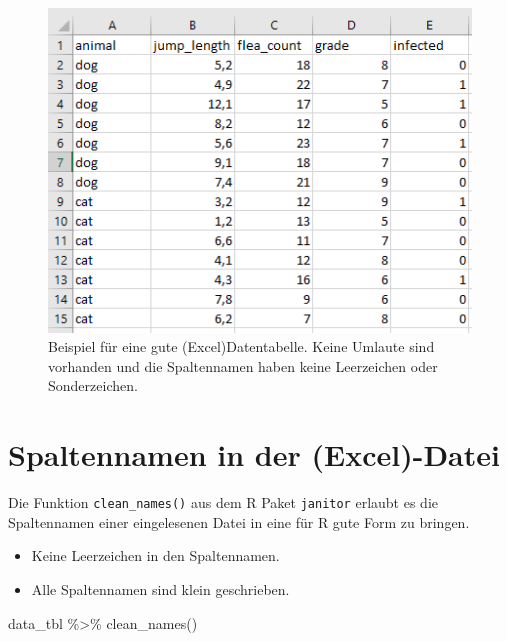 \documentclass[
  letterpaper,
]{scrbook}
\newenvironment{Shaded}{\begin{snugshade}}{\end{snugshade}}
\newcommand{\FunctionTok}[1]{\textcolor[rgb]{0.28,0.35,0.67}{#1}}
\newcommand{\NormalTok}[1]{\textcolor[rgb]{0.00,0.23,0.31}{#1}}
\newcommand{\SpecialCharTok}[1]{\textcolor[rgb]{0.37,0.37,0.37}{#1}}
\providecommand{\tightlist}{%
  \setlength{\itemsep}{0pt}\setlength{\parskip}{0pt}}\usepackage{longtable,booktabs,array}
\begin{document}
\begin{figure}

{\centering \includegraphics{./images/import_03.PNG}

}

\caption{\label{fig-imp-03}Beispiel für eine gute (Excel)Datentabelle.
Keine Umlaute sind vorhanden und die Spaltennamen haben keine
Leerzeichen oder Sonderzeichen.}

\end{figure}

\hypertarget{sec-spalten}{%
\section{Spaltennamen in der (Excel)-Datei}\label{sec-spalten}}

Die Funktion \texttt{clean\_names()} aus dem R Paket \texttt{janitor}
erlaubt es die Spaltennamen einer eingelesenen Datei in eine für R gute
Form zu bringen.

\begin{itemize}
\tightlist
\item
  Keine Leerzeichen in den Spaltennamen.
\item
  Alle Spaltennamen sind klein geschrieben.
\end{itemize}

\begin{Shaded}
\begin{Highlighting}[]
\NormalTok{data\_tbl }\SpecialCharTok{\%\textgreater{}\%} 
  \FunctionTok{clean\_names}\NormalTok{()}
\end{Highlighting}
\end{Shaded}
\end{document}
